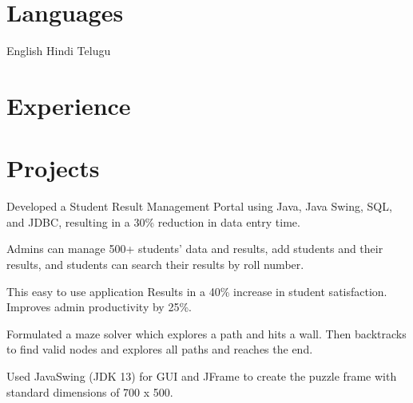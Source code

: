 \documentclass[]{deedy-resume-openfont}
\begin{document}
\begin{minipage}[t]{0.33\textwidth}
\section{Languages}
\textbullet{} English 
\textbullet{} Hindi 
\textbullet{} Telugu \\
\sectionsep
%
%

\end{minipage} 
\hfill
\begin{minipage}[t]{0.66\textwidth} 

\section{Experience}


\section{Projects}

\vspace{\topsep} %

\begin{tightemize}
\item Developed a Student Result Management Portal using Java, Java Swing, SQL, and JDBC, resulting in a 30\% reduction in data entry time. 
\item Admins can manage 500+ students' data and results, add students and their results, and students can search their results by roll number.
\item This easy to use application Results in a 40\% increase in student satisfaction. Improves admin productivity by 25\%.
\end{tightemize}
\sectionsep

\begin{tightemize}
\item Formulated a maze solver which explores a path and hits a wall. Then backtracks to find valid nodes and explores all paths and reaches the end.
\item  Used JavaSwing (JDK 13) for GUI and JFrame to create the puzzle frame with standard dimensions of 700 x 500.


\end{tightemize}
\end{minipage}
\end{document}
